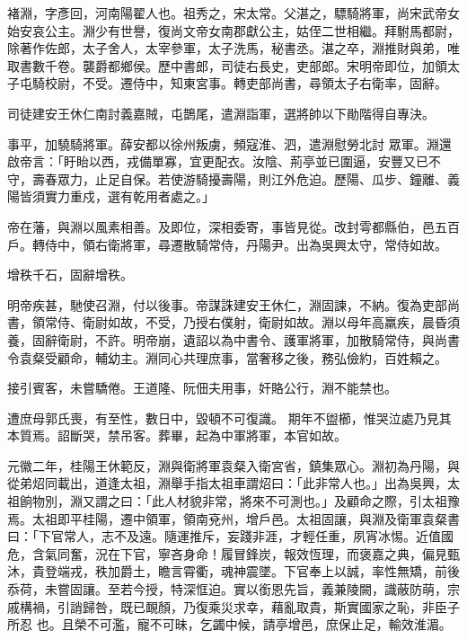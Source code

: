 
\begin{pinyinscope}

 褚淵，字彥回，河南陽翟人也。祖秀之，宋太常。父湛之，驃騎將軍，尚宋武帝女始安哀公主。淵少有世譽，復尚文帝女南郡獻公主，姑侄二世相繼。拜駙馬都尉，除著作佐郎，太子舍人，太宰參軍，太子洗馬，秘書丞。湛之卒，淵推財與弟，唯取書數千卷。襲爵都鄉侯。歷中書郎，司徒右長史，吏部郎。宋明帝即位，加領太子屯騎校尉，不受。遷侍中，知東宮事。轉吏部尚書，尋領太子右衛率，固辭。



 司徒建安王休仁南討義嘉賊，屯鵲尾，遣淵詣軍，選將帥以下勛階得自專決。



 事平，加驍騎將軍。薛安都以徐州叛虜，頻寇淮、泗，遣淵慰勞北討
 眾軍。淵還啟帝言：「盱眙以西，戎備單寡，宜更配衣。汝陰、荊亭並已圍逼，安豐又已不守，壽春眾力，止足自保。若使游騎擾壽陽，則江外危迫。歷陽、瓜步、鐘離、義陽皆須實力重戍，選有乾用者處之。」



 帝在藩，與淵以風素相善。及即位，深相委寄，事皆見從。改封雩都縣伯，邑五百戶。轉侍中，領右衛將軍，尋遷散騎常侍，丹陽尹。出為吳興太守，常侍如故。



 增秩千石，固辭增秩。



 明帝疾甚，馳使召淵，付以後事。帝謀誅建安王休仁，淵固諫，不納。復為吏部尚書，領常侍、衛尉如故，不受，乃授右僕射，衛尉如故。淵以母年高羸疾，晨昏須養，固辭衛尉，不許。明帝崩，遺詔以為中書令、護軍將軍，加散騎常侍，與尚書令袁粲受顧命，輔幼主。淵同心共理庶事，當奢移之後，務弘儉約，百姓賴之。



 接引賓客，未嘗驕倦。王道隆、阮佃夫用事，奸賂公行，淵不能禁也。



 遭庶母郭氏喪，有至性，數日中，毀頓不可復識。
 期年不盥櫛，惟哭泣處乃見其本質焉。詔斷哭，禁吊客。葬畢，起為中軍將軍，本官如故。



 元徽二年，桂陽王休範反，淵與衛將軍袁粲入衛宮省，鎮集眾心。淵初為丹陽，與從弟炤同載出，道逢太祖，淵舉手指太祖車謂炤曰：「此非常人也。」出為吳興，太祖餉物別，淵又謂之曰：「此人材貌非常，將來不可測也。」及顧命之際，引太祖豫焉。太祖即平桂陽，遷中領軍，領南兗州，增戶邑。太祖固讓，與淵及衛軍袁粲書曰：「下官常人，志不及遠。隨運推斥，妄踐非涯，才輕任重，夙宵冰惕。近值國危，含氣同奮，況在下官，寧吝身命！履冒鋒炭，報效恆理，而褒嘉之典，偏見甄沐，貴登端戎，秩加爵土，瞻言霄衢，魂神震墜。下官奉上以誠，率性無矯，前後忝荷，未嘗固讓。至若今授，特深恇迫。實以銜恩先旨，義兼陵闕，識蔽防萌，宗戚構禍，引誚歸咎，既已靦顏，乃復乘災求幸，藉亂取貴，斯實國家之恥，非臣子所忍
 也。且榮不可濫，寵不可昧，乞蠲中候，請亭增邑，庶保止足，輸效淮湄。




\end{pinyinscope}
